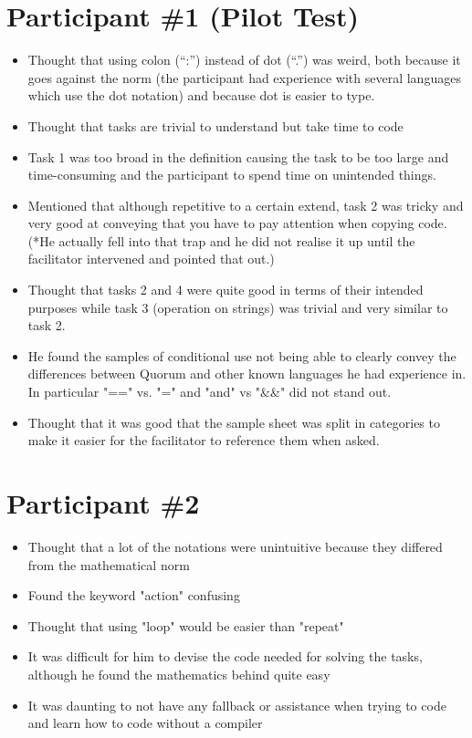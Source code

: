 \section{Participant {\#}1 (Pilot Test)}
\begin{itemize}
\item Thought that using colon (“:”) instead of dot (“.”) was weird, both because it goes against the norm (the participant had experience with several languages which use the dot notation) and because dot is easier to type. 
\item Thought that tasks are trivial to understand but take time to code
\item Task 1 was too broad in the definition causing the task to be too large and time-consuming and the participant to spend time on unintended things.
\item Mentioned that although repetitive to a certain extend, task 2 was tricky and very good at conveying that you have to pay attention when copying code. 
(*He actually fell into that trap and he did not realise it up until the facilitator intervened and pointed that out.) 
\item Thought that tasks 2 and 4 were quite good in terms of their intended purposes while task 3 (operation on strings) was trivial and very similar to task 2. 
\item He found the samples of conditional use not being able to clearly convey the differences between Quorum and other known languages he had experience in. In particular "==" vs. "=" and "and" vs "\&\&" did not stand out.
\item Thought that it was good that the sample sheet was split in categories to make it easier for the facilitator to reference them when asked.
\end{itemize}
\section{Participant {\#}2}
\begin{itemize}
\item Thought that a lot of the notations were unintuitive because they differed from the mathematical norm
\item Found the keyword "action" confusing 
\item Thought that using "loop" would be easier than "repeat"
\item It was difficult for him to devise the code needed for solving the tasks, although he found the mathematics behind quite easy
\item It was daunting to not have any fallback or assistance when trying to code and learn how to code without a compiler
\end{itemize}
